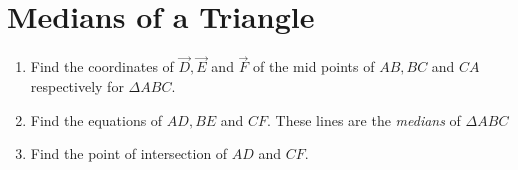 \documentclass[journal,12pt,twocolumn]{IEEEtran}
\renewcommand\thesection{\arabic{section}}
\begin{document}
\section{Medians of a Triangle}
\begin{enumerate}[label=\thesection.\arabic*
,ref=\thesection.\theenumi]

\item
Find the coordinates of $\vec{D}, \vec{E}$ and $\vec{F}$ of the mid points of $AB, BC$ and $CA$ respectively 
for  $\Delta ABC$. 
%
\item
Find the equations of $AD,BE$ and $CF$. These lines are the {\em medians} of $\Delta ABC$
%
\item
\label{prob:median}
Find the point of intersection of $AD$ and $CF$.

\end{enumerate}
\end{document}
